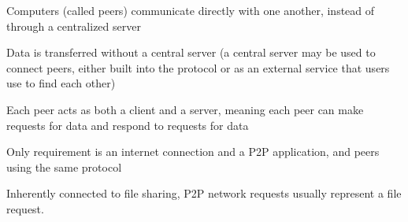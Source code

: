 \begin{summary}
Computers (called peers) communicate directly with one another, instead of
through a centralized server

Data is transferred without a central server (a central server may be used to
connect peers, either built into the protocol or as an external service that
users use to find each other)

Each peer acts as both a client and a server, meaning each peer can make
requests for data and respond to requests for data

Only requirement is an internet connection and a P2P application, and peers
using the same protocol

Inherently connected to file sharing, P2P network requests usually represent a
file request.
\end{summary}

